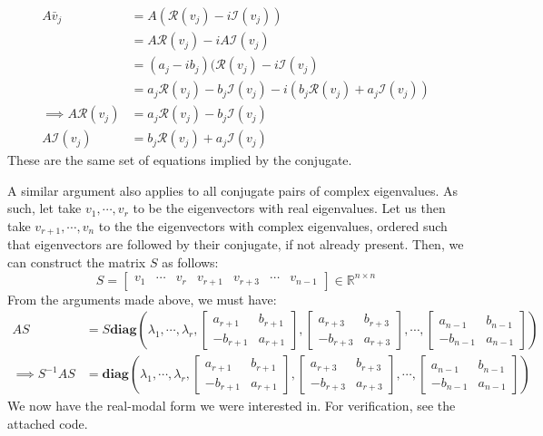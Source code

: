\documentclass[12pt]{exam}
\begin{document}
\begin{questions}
\begin{solution}
    \begin{align*}
      A\bar{v}_j &= A(\mathcal{R}(v_j) - i \mathcal{I}(v_j)) \\
      &= A\mathcal{R}(v_j) - i A \mathcal{I}(v_j) \\
      &= (a_j - ib_j)(\mathcal{R}(v_j) - i \mathcal{I}(v_j) \\
      &=  a_j\mathcal{R}(v_j) - b_j\mathcal{I}(v_j) - i(b_j\mathcal{R}(v_j) + a_j\mathcal{I}(v_j)) \\ 
    \implies A\mathcal{R}(v_j) &=  a_j\mathcal{R}(v_j) - b_j\mathcal{I}(v_j) \\
    A\mathcal{I}(v_j) &= b_j\mathcal{R}(v_j) + a_j\mathcal{I}(v_j)
    \end{align*}
    These are the same set of equations implied by the conjugate.
    
    A similar argument also applies to all conjugate pairs of complex eigenvalues. As such, let take $v_1, \cdots, v_r$ to be the eigenvectors with real eigenvalues. Let us then take $v_{r+1}, \cdots, v_n$ to the the eigenvectors with complex eigenvalues, ordered such that eigenvectors are followed by their conjugate, if not already present. Then, we can construct the matrix $S$ as follows:
    \[
      S = \begin{bmatrix} v_1 & \cdots &  v_r & v_{r+1} & v_{r+3} & \cdots & v_{n-1}\end{bmatrix} \in \mathbb{R}^{n \times n}
    \]
    From the arguments made above, we must have:
    \begin{align*}
      AS &= S\textbf{diag}\left(\lambda_1, \cdots, \lambda_r, \begin{bmatrix} a_{r+1} & b_{r+1} \\ -b_{r+1} & a_{r+1} \end{bmatrix},  \begin{bmatrix} a_{r+3} & b_{r+3} \\ -b_{r+3} & a_{r+3} \end{bmatrix}, \cdots,  \begin{bmatrix} a_{n-1} & b_{n-1} \\ -b_{n-1}  & a_{n-1} \end{bmatrix}\right) \\
      \implies S^{-1}AS &= \textbf{diag}\left(\lambda_1, \cdots, \lambda_r, \begin{bmatrix} a_{r+1} & b_{r+1} \\ -b_{r+1} & a_{r+1} \end{bmatrix},  \begin{bmatrix} a_{r+3} & b_{r+3} \\ -b_{r+3} & a_{r+3} \end{bmatrix}, \cdots,  \begin{bmatrix} a_{n-1} & b_{n-1} \\ -b_{n-1}  & a_{n-1} \end{bmatrix}\right)
    \end{align*}
    We now have the real-modal form we were interested in. For verification, see the attached code.

  \end{solution}


  \newpage
\end{questions}
\end{document}
